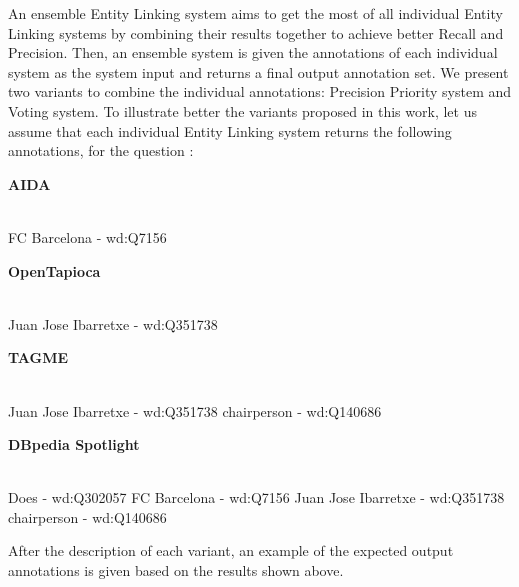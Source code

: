 An ensemble Entity Linking system aims to get the most of all individual Entity Linking 
systems by combining their results together to achieve better Recall and Precision. Then, an 
ensemble system is given the annotations of each individual system as the system input and 
returns a final output annotation set. We present two variants to combine the individual 
annotations: Precision Priority system and Voting system. To illustrate better the variants 
proposed in this work, let us assume that each individual 
Entity Linking system returns the following annotations, for the question :

\newpage

\noindent \textbf{AIDA}\\
\mbox{}\\
\begin{sparqlcode}[]
FC Barcelona - wd:Q7156
\end{sparqlcode}

\noindent \textbf{OpenTapioca}\\
\mbox{}\\
\begin{sparqlcode}[]
Juan Jose Ibarretxe - wd:Q351738  
\end{sparqlcode}

\noindent \textbf{TAGME}\\
\mbox{}\\
\begin{sparqlcode}[]
Juan Jose Ibarretxe - wd:Q351738    
chairperson - wd:Q140686  
\end{sparqlcode}

\noindent \textbf{DBpedia Spotlight}\\
\mbox{}\\
\begin{sparqlcode}[]
Does - wd:Q302057
FC Barcelona - wd:Q7156
Juan Jose Ibarretxe - wd:Q351738
chairperson - wd:Q140686    
\end{sparqlcode}

After the description of each variant, an example of the expected output annotations is given 
based on the results shown above.


